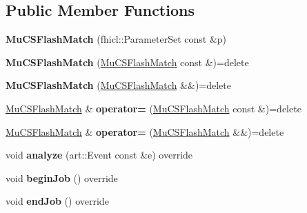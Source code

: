 \subsection*{Public Member Functions}
\begin{DoxyCompactItemize}
\item 
\hypertarget{classMuCSFlashMatch_a62514ddde6a8cf63e3db49649f310468}{{\bfseries Mu\-C\-S\-Flash\-Match} (fhicl\-::\-Parameter\-Set const \&p)}\label{classMuCSFlashMatch_a62514ddde6a8cf63e3db49649f310468}

\item 
\hypertarget{classMuCSFlashMatch_ac77d995753767965120cb78c4942e00c}{{\bfseries Mu\-C\-S\-Flash\-Match} (\hyperlink{classMuCSFlashMatch}{Mu\-C\-S\-Flash\-Match} const \&)=delete}\label{classMuCSFlashMatch_ac77d995753767965120cb78c4942e00c}

\item 
\hypertarget{classMuCSFlashMatch_afced500e296fe05c37e0f1fe112656a9}{{\bfseries Mu\-C\-S\-Flash\-Match} (\hyperlink{classMuCSFlashMatch}{Mu\-C\-S\-Flash\-Match} \&\&)=delete}\label{classMuCSFlashMatch_afced500e296fe05c37e0f1fe112656a9}

\item 
\hypertarget{classMuCSFlashMatch_aa10a3d1be2ea8418188c227d7c4d8864}{\hyperlink{classMuCSFlashMatch}{Mu\-C\-S\-Flash\-Match} \& {\bfseries operator=} (\hyperlink{classMuCSFlashMatch}{Mu\-C\-S\-Flash\-Match} const \&)=delete}\label{classMuCSFlashMatch_aa10a3d1be2ea8418188c227d7c4d8864}

\item 
\hypertarget{classMuCSFlashMatch_a32339a6105ca8917adedc979b7c7e1da}{\hyperlink{classMuCSFlashMatch}{Mu\-C\-S\-Flash\-Match} \& {\bfseries operator=} (\hyperlink{classMuCSFlashMatch}{Mu\-C\-S\-Flash\-Match} \&\&)=delete}\label{classMuCSFlashMatch_a32339a6105ca8917adedc979b7c7e1da}

\item 
\hypertarget{classMuCSFlashMatch_a17c649cc0efeb756d5432933aa6304cb}{void {\bfseries analyze} (art\-::\-Event const \&e) override}\label{classMuCSFlashMatch_a17c649cc0efeb756d5432933aa6304cb}

\item 
\hypertarget{classMuCSFlashMatch_a578dda78eddb4be556e8ddd40b4da5ea}{void {\bfseries begin\-Job} () override}\label{classMuCSFlashMatch_a578dda78eddb4be556e8ddd40b4da5ea}

\item 
\hypertarget{classMuCSFlashMatch_a2318ec9d880d49696596a93848c38e2c}{void {\bfseries end\-Job} () override}\label{classMuCSFlashMatch_a2318ec9d880d49696596a93848c38e2c}

\end{DoxyCompactItemize}
